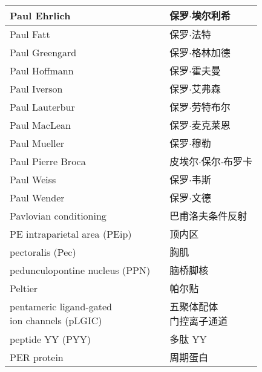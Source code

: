 \begin{longtable}{lll}
	\midrule
	Paul Ehrlich     && 保罗$\cdot$埃尔利希  \\
	
	\midrule
	Paul Fatt     && 保罗$\cdot$法特  \\
	
	\midrule
	Paul Greengard     && 保罗$\cdot$格林加德  \\
	
	\midrule
	Paul Hoffmann     && 保罗$\cdot$霍夫曼  \\
	
	\midrule
	Paul Iverson     && 保罗$\cdot$艾弗森  \\
	
	\midrule
	Paul Lauterbur     && 保罗$\cdot$劳特布尔  \\
	
	\midrule
	Paul MacLean     && 保罗$\cdot$麦克莱恩  \\
	
	\midrule
	Paul Mueller     && 保罗$\cdot$穆勒  \\
	
	\midrule
	Paul Pierre Broca     && 皮埃尔$\cdot$保尔$\cdot$布罗卡  \\
	
	\midrule
	Paul Weiss     && 保罗$\cdot$韦斯  \\
	
	\midrule
	Paul Wender     && 保罗$\cdot$文德  \\
	
	\midrule
	Pavlovian conditioning     && 巴甫洛夫条件反射  \\
	
	\midrule
	PE intraparietal area (PEip)   && 顶内区   \\
	
	\midrule
	pectoralis (Pec)    && 胸肌   \\
	
	\midrule
	pedunculopontine nucleus (PPN)     && 脑桥脚核   \\
	
	\midrule
	Peltier     && 帕尔贴   \\
	
	\midrule
	\makecell[l]{pentameric ligand-gated \\ion channels (pLGIC)}     && \makecell[l]{五聚体配体\\门控离子通道}   \\
	
	\midrule
	peptide YY (PYY)     && 多肽 YY   \\
	
	\midrule
	PER protein     && 周期蛋白   \\
	

\end{longtable}
